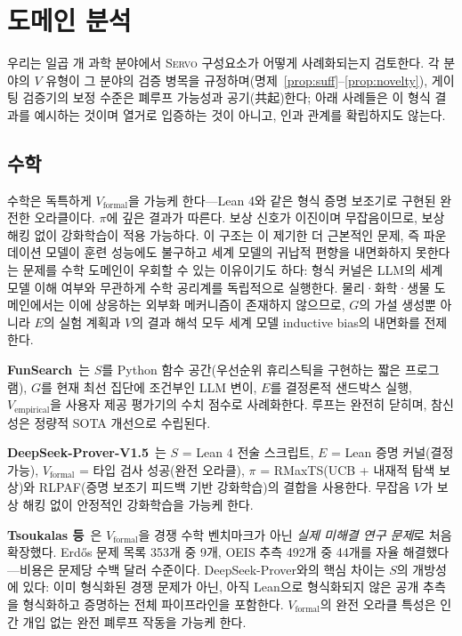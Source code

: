 \documentclass[11pt]{article}
\newcommand{\framework}{\textsc{Servo}}
\begin{document}
\section{도메인 분석}
\label{sec:domains}

우리는 일곱 개 과학 분야에서 \framework{} 구성요소가 어떻게 사례화되는지 검토한다. 각 분야의 $V$ 유형이 그 분야의 검증 병목을 규정하며(명제~\ref{prop:suff}--\ref{prop:novelty}), 게이팅 검증기의 보정 수준은 폐루프 가능성과 공기(共起)한다; 아래 사례들은 이 형식 결과를 예시하는 것이며 열거로 입증하는 것이 아니고, 인과 관계를 확립하지도 않는다.

\subsection{수학}

수학은 독특하게 $V_\text{formal}$을 가능케 한다---Lean 4와 같은 형식 증명 보조기로 구현된 완전한 오라클이다. $\pi$에 깊은 결과가 따른다. 보상 신호가 이진이며 무잡음이므로, 보상 해킹 없이 강화학습이 적용 가능하다. 이 구조는 \citet{vafa2025foundationmodel}이 제기한 더 근본적인 문제, 즉 파운데이션 모델이 훈련 성능에도 불구하고 세계 모델의 귀납적 편향을 내면화하지 못한다는 문제를 수학 도메인이 우회할 수 있는 이유이기도 하다: 형식 커널은 LLM의 세계 모델 이해 여부와 무관하게 수학 공리계를 독립적으로 실행한다. 물리·화학·생물 도메인에서는 이에 상응하는 외부화 메커니즘이 존재하지 않으므로, $G$의 가설 생성뿐 아니라 $E$의 실험 계획과 $V$의 결과 해석 모두 세계 모델 inductive bias의 내면화를 전제한다.

\textbf{FunSearch}~\citep{romera2023funsearch}는 $S$를 Python 함수 공간(우선순위 휴리스틱을 구현하는 짧은 프로그램), $G$를 현재 최선 집단에 조건부인 LLM 변이, $E$를 결정론적 샌드박스 실행, $V_\text{empirical}$을 사용자 제공 평가기의 수치 점수로 사례화한다. 루프는 완전히 닫히며, 참신성은 정량적 SOTA 개선으로 수립된다.

\textbf{DeepSeek-Prover-V1.5}~\citep{xin2024deepseek}는 $S$ = Lean 4 전술 스크립트, $E$ = Lean 증명 커널(결정 가능), $V_\text{formal}$ = 타입 검사 성공(완전 오라클), $\pi$ = RMaxTS(UCB + 내재적 탐색 보상)와 RLPAF(증명 보조기 피드백 기반 강화학습)의 결합을 사용한다. 무잡음 $V$가 보상 해킹 없이 안정적인 강화학습을 가능케 한다.

\textbf{Tsoukalas 등}~\citep{tsoukalas2026formalproof}은 $V_\text{formal}$을 경쟁 수학 벤치마크가 아닌 \emph{실제 미해결 연구 문제}로 처음 확장했다. Erd\H{o}s 문제 목록 353개 중 9개, OEIS 추측 492개 중 44개를 자율 해결했다---비용은 문제당 수백 달러 수준이다. DeepSeek-Prover와의 핵심 차이는 $S$의 개방성에 있다: 이미 형식화된 경쟁 문제가 아닌, 아직 Lean으로 형식화되지 않은 공개 추측을 형식화하고 증명하는 전체 파이프라인을 포함한다. $V_\text{formal}$의 완전 오라클 특성은 인간 개입 없는 완전 폐루프 작동을 가능케 한다.
\end{document}

